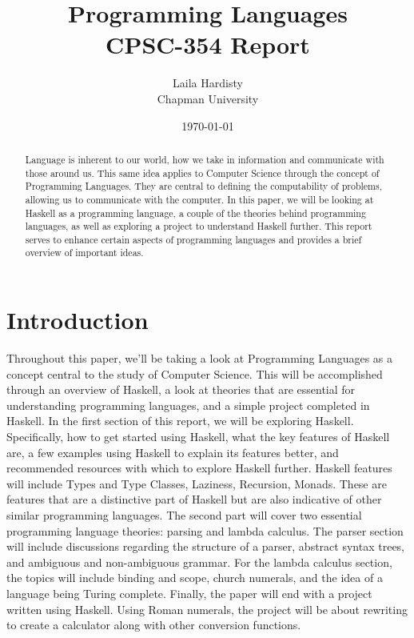 \documentclass{article}
\title{%
  Programming Languages \\
  \large CPSC-354 Report}
\author{Laila Hardisty  \\ Chapman University}
\date{\today}
\begin{document}
\maketitle

\begin{abstract}
Language is inherent to our world, how we take in information and communicate with those around us. This same idea applies to Computer Science through the concept of Programming Languages. They are central to defining the computability of problems, allowing us to communicate with the computer. In this paper, we will be looking at Haskell as a programming language, a couple of the theories behind programming languages, as well as exploring a project to understand Haskell further. This report serves to enhance certain aspects of programming languages and provides a brief overview of important ideas.
\end{abstract}

\break

\tableofcontents

\break

\section{Introduction}\label{intro}

Throughout this paper, we’ll be taking a look at Programming Languages as a concept central to the study of Computer Science. This will be accomplished through an overview of Haskell, a look at theories that are essential for understanding programming languages, and a simple project completed in Haskell. In the first section of this report, we will be exploring Haskell. Specifically, how to get started using Haskell, what the key features of Haskell are, a few examples using Haskell to explain its features better, and recommended resources with which to explore Haskell further. Haskell features will include Types and Type Classes, Laziness, Recursion, Monads. These are features that are a distinctive part of Haskell but are also indicative of other similar programming languages. The second part will cover two essential programming language theories: parsing and lambda calculus. The parser section will include discussions regarding the structure of a parser, abstract syntax trees, and ambiguous and non-ambiguous grammar. For the lambda calculus section, the topics will include binding and scope, church numerals, and the idea of a language being Turing complete. Finally, the paper will end with a project written using Haskell. Using Roman numerals, the project will be about rewriting to create a calculator along with other conversion functions. 
\end{document}
